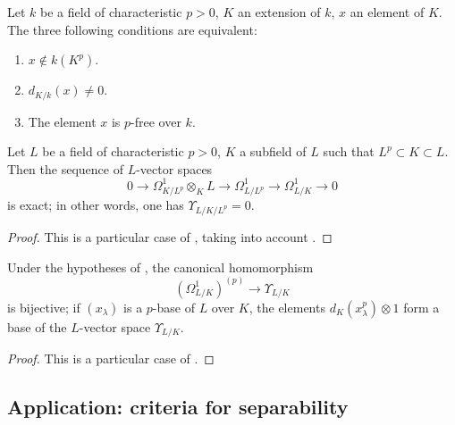 \begin{corollary}[21.4.6]
\label{0.21.4.6}
Let $k$ be a field of characteristic $p>0$, $K$ an extension of $k$, $x$ an element of $K$.
The three following conditions are equivalent:
\begin{enumerate}
  \item[\rm \textup{a)}] $x\notin k(K^p)$.
  \item[\rm \textup{b)}] $d_{K/k}(x)\neq 0$.
  \item[\rm c)] The element $x$ is $p$-free over $k$.
\end{enumerate}
\end{corollary}

\begin{proposition}[21.4.7]
\label{0.21.4.7}
Let $L$ be a field of characteristic $p>0$, $K$ a subfield of $L$ such that $L^p\subset K\subset L$.
Then the sequence of $L$-vector spaces
\begin{equation}
\tag{21.4.7.1}
  \label{0.21.4.7.1}
  0\to\Omega^1_{K/L^p}\otimes_K L\to\Omega^1_{L/L^p}\to\Omega^1_{L/K}\to 0
\end{equation}
is exact; in other words, one has $\Upsilon_{L/K/L^p}=0$.
\end{proposition}

\begin{proof}
This is a particular case of , taking into account .
\end{proof}

\begin{proposition}[21.4.8]
\label{0.21.4.8}
Under the hypotheses of , the canonical homomorphism
\begin{equation}
\tag{21.4.8.1}
  \label{0.21.4.8.1}
  (\Omega^1_{L/K})^{(p)}\to\Upsilon_{L/K}
\end{equation}
is bijective; if $(x_\lambda)$ is a $p$-base of $L$ over $K$, the elements $d_K(x^p_\lambda)\otimes 1$ form a base of the $L$-vector space $\Upsilon_{L/K}$.
\end{proposition}

\begin{proof}
This is a particular case of .
\end{proof}

\subsection{Application: criteria for separability}
\label{subsection:0.21.5}

